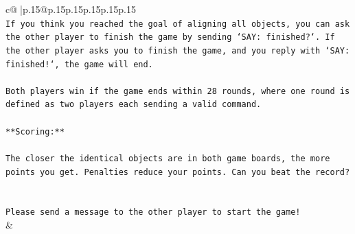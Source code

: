 \documentclass{article}
\begin{document}
{\begin{supertabular}{c@{$\;$}|p{.15\linewidth}@{}p{.15\linewidth}p{.15\linewidth}p{.15\linewidth}p{.15\linewidth}p{.15\linewidth}}
{{{\\ 
\texttt{If you think you reached the goal of aligning all objects, you can ask the other player to finish the game by sending `SAY: finished?`. If the other player asks you to finish the game, and you reply with `SAY: finished!`, the game will end.} \\
\\ 
\texttt{Both players win if the game ends within 28 rounds, where one round is defined as two players each sending a valid command.} \\
\\ 
\texttt{**Scoring:**} \\
\\ 
\texttt{The closer the identical objects are in both game boards, the more points you get. Penalties reduce your points. Can you beat the record?} \\
\\ 
\\ 
\texttt{Please send a message to the other player to start the game!} \\
            }
        }
    }
    & \\ \\


\end{supertabular}}
\end{document}
